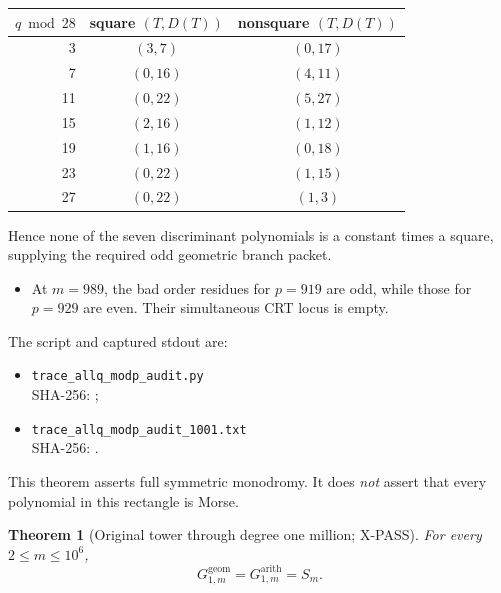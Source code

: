 \documentclass[11pt]{article}
\theoremstyle{keio}
\newtheorem{theorem}{Theorem}[section]
\theoremstyle{definition}
\theoremstyle{remark}
\newcommand{\XPASS}{\textcolor{keioxblue}{\textsf{X-PASS}}}
\begin{document}
\begin{center}
\small
\begin{tabular}{@{}rcc@{}}
\toprule
$q\bmod 28$ & square $(T,D(T))$ & nonsquare $(T,D(T))$\\
\midrule
3  & $(3,7)$  & $(0,17)$\\
7  & $(0,16)$ & $(4,11)$\\
11 & $(0,22)$ & $(5,27)$\\
15 & $(2,16)$ & $(1,12)$\\
19 & $(1,16)$ & $(0,18)$\\
23 & $(0,22)$ & $(1,15)$\\
27 & $(0,22)$ & $(1,3)$\\
\bottomrule
\end{tabular}
\end{center}

Hence none of the seven discriminant polynomials is a constant times a
square, supplying the required odd geometric branch packet.

\begin{itemize}
\item At $m=989$, the bad order residues for $p=919$ are odd, while those
for $p=929$ are even. Their simultaneous CRT locus is empty.
\end{itemize}

The script and captured stdout are:
\begin{itemize}
\item \nolinkurl{trace_allq_modp_audit.py}\\[-.15em]
\textcolor{bluegray}{\small SHA-256: }
\texttt{\small{}};
\item \nolinkurl{trace_allq_modp_audit_1001.txt}\\[-.15em]
\textcolor{bluegray}{\small SHA-256: }
\texttt{\small{}}.
\end{itemize}

\begin{notebox}
This theorem asserts full symmetric monodromy. It does \emph{not} assert
that every polynomial in this rectangle is Morse.
\end{notebox}

\begin{theorem}[Original tower through degree one million; \XPASS]\label{thm:million}
For every $2\le m\le10^6$,
\begin{equation}
\boxed{G^{\mathrm{geom}}_{1,m}=G^{\mathrm{arith}}_{1,m}=S_m.}
\label{eq:million}
\end{equation}
\end{theorem}
\end{document}
